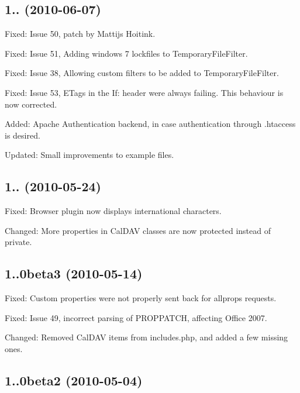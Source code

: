 \subsection*{1.. (2010-\/06-\/07) }


\begin{DoxyItemize}
\item Fixed\+: Issue 50, patch by Mattijs Hoitink.
\item Fixed\+: Issue 51, Adding windows 7 lockfiles to Temporary\+File\+Filter.
\item Fixed\+: Issue 38, Allowing custom filters to be added to Temporary\+File\+Filter.
\item Fixed\+: Issue 53, E\+Tags in the If\+: header were always failing. This behaviour is now corrected.
\item Added\+: Apache Authentication backend, in case authentication through .htaccess is desired.
\item Updated\+: Small improvements to example files.
\end{DoxyItemize}

\subsection*{1.. (2010-\/05-\/24) }


\begin{DoxyItemize}
\item Fixed\+: Browser plugin now displays international characters.
\item Changed\+: More properties in Cal\+D\+AV classes are now protected instead of private.
\end{DoxyItemize}

\subsection*{1..\+0beta3 (2010-\/05-\/14) }


\begin{DoxyItemize}
\item Fixed\+: Custom properties were not properly sent back for allprops requests.
\item Fixed\+: Issue 49, incorrect parsing of P\+R\+O\+P\+P\+A\+T\+CH, affecting Office 2007.
\item Changed\+: Removed Cal\+D\+AV items from includes.\+php, and added a few missing ones.
\end{DoxyItemize}

\subsection*{1..\+0beta2 (2010-\/05-\/04) }


